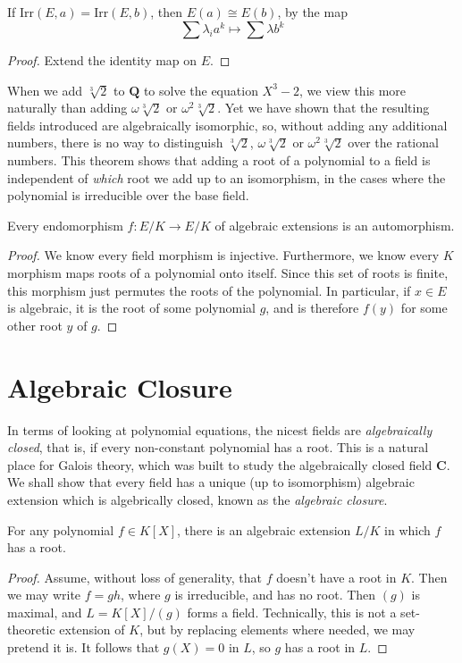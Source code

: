 \begin{corollary}
    If $\text{Irr}(E,a) = \text{Irr}(E,b)$, then $E(a) \cong E(b)$, by the map
    \[ \sum \lambda_i a^k \mapsto \sum \lambda b^k \]
\end{corollary}
\begin{proof}
    Extend the identity map on $E$.
\end{proof}

When we add $\sqrt[3]{2}$ to $\mathbf{Q}$ to solve the equation $X^3 - 2$, we view this more naturally than adding $\omega \sqrt[3]{2}$ or $\omega^2 \sqrt[3]{2}$. Yet we have shown that the resulting fields introduced are algebraically isomorphic, so, without adding any additional numbers, there is no way to distinguish $\sqrt[3]{2}$, $\omega \sqrt[3]{2}$ or $\omega^2 \sqrt[3]{2}$ over the rational numbers. This theorem shows that adding a root of a polynomial to a field is independent of {\it which} root we add up to an isomorphism, in the cases where the polynomial is irreducible over the base field.

\begin{corollary}
    Every endomorphism $f: E/K \to E/K$ of algebraic extensions is an automorphism.
\end{corollary}
\begin{proof}
	We know every field morphism is injective. Furthermore, we know every $K$ morphism maps roots of a polynomial onto itself. Since this set of roots is finite, this morphism just permutes the roots of the polynomial. In particular, if $x \in E$ is algebraic, it is the root of some polynomial $g$, and is therefore $f(y)$ for some other root $y$ of $g$.
\end{proof}

\section{Algebraic Closure}

In terms of looking at polynomial equations, the nicest fields are {\it algebraically closed}, that is, if every non-constant polynomial has a root. This is a natural place for Galois theory, which was built to study the algebraically closed field $\mathbf{C}$. We shall show that every field has a unique (up to isomorphism) algebraic extension which is algebrically closed, known as the {\it algebraic closure}.

\begin{lemma}
    For any polynomial $f \in K[X]$, there is an algebraic extension $L/K$ in which $f$ has a root.
\end{lemma}
\begin{proof}
    Assume, without loss of generality, that $f$ doesn't have a root in $K$. Then we may write $f = gh$, where $g$ is irreducible, and has no root. Then $(g)$ is maximal, and $L = K[X]/(g)$ forms a field. Technically, this is not a set-theoretic extension of $K$, but by replacing elements where needed, we may pretend it is. It follows that $g(X) = 0$ in $L$, so $g$ has a root in $L$.
\end{proof}

